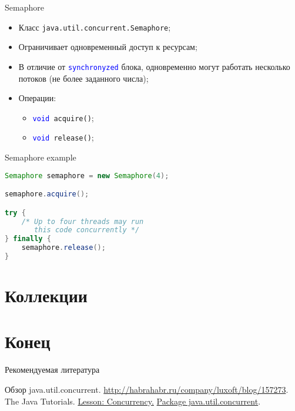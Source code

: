 \begin{frame}{Semaphore}
\begin{itemize}
    \item Класс \texttt{java.util.concurrent.Semaphore};
    \item Ограничивает одновременный доступ к ресурсам;
    \item В отличие от \textcolor{blue}{\texttt{synchronyzed}} блока, одновременно могут работать несколько потоков (не более заданного числа);
    \item Операции:
    \begin{itemize}
        \item \texttt{\textcolor{blue}{void} acquire()};
        \item \texttt{\textcolor{blue}{void} release()};
    \end{itemize}
\end{itemize}
\end{frame}

\begin{frame}[fragile]{Semaphore example}
\begin{lstlisting}[language=Java]
Semaphore semaphore = new Semaphore(4);

semaphore.acquire();

try {
    /* Up to four threads may run
       this code concurrently */
} finally {
    semaphore.release();
}
\end{lstlisting}
\end{frame}

\section{Коллекции}

\section*{Конец}

\begin{frame}[allowframebreaks]{Рекомендуемая литература}
\begin{thebibliography}{99}
    \bibitem{} Обзор java.util.concurrent.
    \url{http://habrahabr.ru/company/luxoft/blog/157273}.
    \bibitem{} The Java Tutorials.
    \href{http://docs.oracle.com/javase/tutorial/essential/concurrency/index.html}{Lesson: Concurrency.}
    \bibitem{} \href{http://docs.oracle.com/javase/7/docs/api/java/util/concurrent/package-summary.html}{Package java.util.concurrent}.
\end{thebibliography}
\end{frame}

